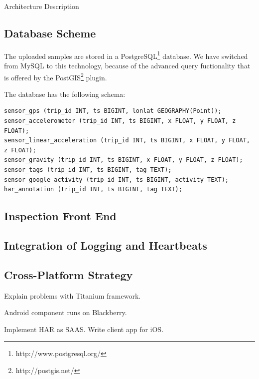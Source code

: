 Architecture Description

\subsection{Database Scheme}

The uploaded samples are stored in a
PostgreSQL\footnote{http://www.postgresql.org/} database. We have
switched from MySQL to this technology, because of the advanced query
fuctionality that is offered by the
PostGIS\footnote{http://postgis.net/} plugin.

The database has the following schema:
{\small
\begin{verbatim}
sensor_gps (trip_id INT, ts BIGINT, lonlat GEOGRAPHY(Point));
sensor_accelerometer (trip_id INT, ts BIGINT, x FLOAT, y FLOAT, z FLOAT);
sensor_linear_acceleration (trip_id INT, ts BIGINT, x FLOAT, y FLOAT, z FLOAT);
sensor_gravity (trip_id INT, ts BIGINT, x FLOAT, y FLOAT, z FLOAT);
sensor_tags (trip_id INT, ts BIGINT, tag TEXT);
sensor_google_activity (trip_id INT, ts BIGINT, activity TEXT);
har_annotation (trip_id INT, ts BIGINT, tag TEXT);
\end{verbatim}}

\subsection{Inspection Front End}


\subsection{Integration of Logging and Heartbeats}



\subsection{Cross-Platform Strategy}
Explain problems with Titanium framework.

Android component runs on Blackberry. 

Implement HAR as SAAS. Write client app for iOS.


